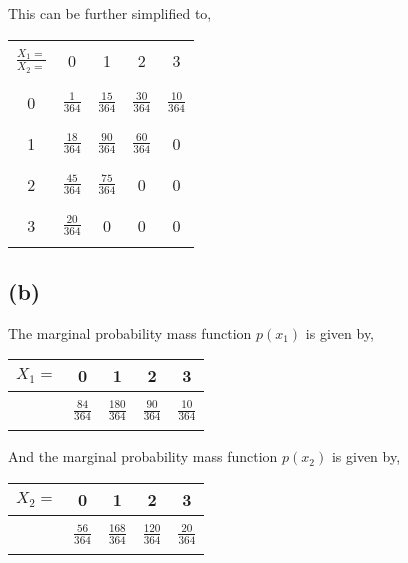 \documentclass{article}
\begin{document}
			This can be further simplified to,
			\begin{center}
			\begin{tabular}{ |c|c|c|c|c|}
			\hline
			& & & &  \\
			$\frac{X_1=}{X_2=}$ & 0 & 1 & 2 & 3 \\
			& & & &  \\
			\hline
			& & & &  \\
			0 & $\frac{1}{364}$ & $\frac{15}{364}$ & $\frac{30}{364}$ & $\frac{10}{364}$  \\
			& & & &  \\
			\hline
			& & & &  \\
			1 & $\frac{18}{364}$  & $\frac{90}{364}$ & $\frac{60}{364}$ & 0  \\
			& & & &  \\
			\hline
			& & & &  \\
			2 & $\frac{45}{364}$ & $\frac{75}{364}$ & 0 & 0 \\
			& & & &  \\
			\hline
			& & & &  \\
			3 & $\frac{20}{364}$ & 0 & 0 & 0 \\
			& & & &  \\
			\hline
			\end{tabular}
			\end{center}
		\subsection*{(b)}
			The marginal probability mass function $p(x_1)$ is given by,
			\begin{center}
			\begin{tabular}{|c|c|c|c|c|}
			\hline
			$X_1=$ & 0 & 1 & 2 & 3 \\
			\hline
			& & & & \\
			& $\frac{84}{364}$ & $\frac{180}{364}$ & $\frac{90}{364}$ & $\frac{10}{364}$ \\ 
			& & & & \\
			\hline
			\end{tabular}
			\end{center}
			
			And the marginal probability mass function $p(x_2)$ is given by,
			\begin{center}
			\begin{tabular}{|c|c|c|c|c|}
			\hline
			$X_2=$ & 0 & 1 & 2 & 3 \\
			\hline
			& & & & \\
			& $\frac{56}{364}$ & $\frac{168}{364}$ & $\frac{120}{364}$ & $\frac{20}{364}$ \\ 
			& & & & \\
			\hline
			\end{tabular}
			\end{center}
\end{document}

